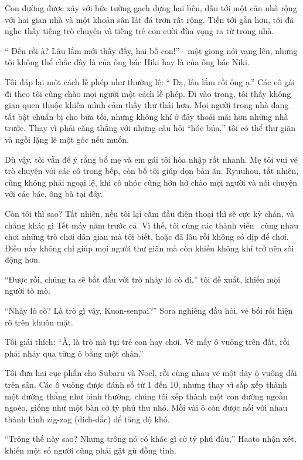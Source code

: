 \documentclass[../main.tex]{subfiles}
\begin{document}
Con đường được xây với bức tường gạch dựng hai bên, dẫn tới một căn nhà rộng với hai gian nhà và một khoản sân lát đá trơn rất rộng. Tiến tới gần hơn, tôi đã nghe thấy tiếng trò chuyện và tiếng trẻ con cười đùa vọng ra từ trong nhà.

``{\color{red} Đến rồi à? Lâu lắm mới thấy đấy, hai bố con!}'' - một giọng nói vang lên, nhưng tôi không thể chắc đây là của ông bác Hiki hay là của ông bác Niki.

Tôi đáp lại một cách lễ phép như thường lệ: ``{\color{red} Dạ, lâu lắm rồi ông ạ.}'' Các cô gái đi theo tôi cũng chào mọi người một cách lễ phép. Đi vào trong, tôi thấy không gian quen thuộc khiến mình cảm thấy thư thái hơn. Mọi người trong nhà đang tất bật chuẩn bị cho bữa tối, nhưng không khí ở đây thoải mái hơn những nhà trước. Thay vì phải căng thẳng với những câu hỏi ``hóc búa,'' tôi có thể thư giãn và ngồi lặng lẽ một góc nếu muốn.

Dù vậy, tôi vẫn để ý rằng bố mẹ và em gái tôi hòa nhập rất nhanh. Mẹ tôi vui vẻ trò chuyện với các cô trong bếp, còn bố tôi giúp dọn bàn ăn. Ryuuhou, tất nhiên, cũng không phải ngoại lệ, khi cô nhóc cũng hớn hở chào mọi người và nói chuyện với các bác, ông bà tại đây.

Còn tôi thì sao? Tất nhiên, nếu tôi lại cắm đầu điện thoại thì sẽ cực kỳ chán, và chẳng khác gì Tết mấy năm trước cả. Vì thế, tôi cùng các thành viên \hll\ cùng nhau chơi những trò chơi dân gian mà tôi biết, hoặc đã lâu rồi không có dịp để chơi. Điều này không chỉ giúp mọi người thư giãn mà còn khiến không khí trở nên sôi động hơn.

\ct

``Được rồi, chúng ta sẽ bắt đầu với trò nhảy lò cò đi,'' tôi đề xuất, khiến mọi người tò mò.

``Nhảy lò cò? Là trò gì vậy, Kuon-senpai?'' Sora nghiêng đầu hỏi, vẻ bối rối hiện rõ trên khuôn mặt.

Tôi giải thích: ``À, là trò mà tụi trẻ con hay chơi. Vẽ mấy ô vuông trên đất, rồi phải nhảy qua từng ô bằng một chân.''

Tôi đưa hai cục phấn cho Subaru và Noel, rồi cùng nhau vẽ một dãy ô vuông dài trên sân. Các ô vuông được đánh số từ 1 đến 10, nhưng thay vì sắp xếp thành một đường thẳng như bình thường, chúng tôi xếp thành một con đường ngoằn ngoèo, giống như một bàn cờ tỷ phú thu nhỏ. Mỗi vài ô còn được nối với nhau thành hình zig-zag (dích-dắc) để tăng độ khó.

``Trông thế này sao? Nhưng trông nó có khác gì cờ tỷ phú đâu,'' Haato nhận xét, khiến một số người cũng phải gật gù đồng tình.
\end{document}
